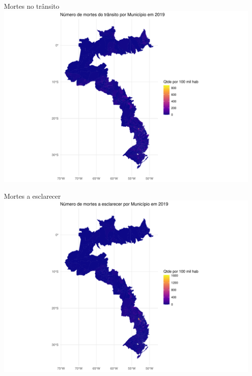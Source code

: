 \documentclass[
  ignorenonframetext,
]{beamer}
\begin{document}
\begin{frame}{Mortes no trânsito}
\label{mortes-no-truxe2nsito}
\includegraphics{graficos_files/figure-beamer/unnamed-chunk-23-1.pdf}
\end{frame}

\begin{frame}{Mortes a esclarecer}
\label{mortes-a-esclarecer}
\includegraphics{graficos_files/figure-beamer/unnamed-chunk-24-1.pdf}
\end{frame}
\end{document}
